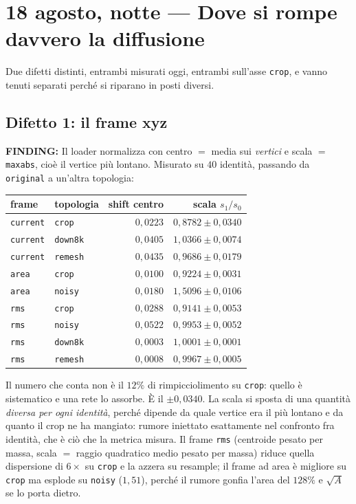 \documentclass[11pt,a4paper]{article}
\newcommand{\finding}[1]{\textcolor{finding}{\textbf{FINDING:}} #1}
\begin{document}
\section{18 agosto, notte --- Dove si rompe davvero la diffusione}

Due difetti distinti, entrambi misurati oggi, entrambi sull'asse \texttt{crop}, e vanno tenuti
separati perch\'e si riparano in posti diversi.

\subsection*{Difetto 1: il frame xyz}

\finding{Il loader normalizza con centro $=$ media sui \emph{vertici} e scala $=$
\texttt{maxabs}, cio\`e il vertice pi\`u lontano. Misurato su $40$ identit\`a, passando da
\texttt{original} a un'altra topologia:}

\begin{center}\small
\begin{tabular}{llrr}
\toprule
frame & topologia & shift centro & scala $s_1/s_0$ \\
\midrule
\texttt{current} & \texttt{crop}   & $0{,}0223$ & $0{,}8782 \pm 0{,}0340$ \\
\texttt{current} & \texttt{down8k} & $0{,}0405$ & $1{,}0366 \pm 0{,}0074$ \\
\texttt{current} & \texttt{remesh} & $0{,}0435$ & $0{,}9686 \pm 0{,}0179$ \\
\midrule
\texttt{area}    & \texttt{crop}   & $0{,}0100$ & $0{,}9224 \pm 0{,}0031$ \\
\texttt{area}    & \texttt{noisy}  & $0{,}0180$ & $1{,}5096 \pm 0{,}0106$ \\
\midrule
\texttt{rms}     & \texttt{crop}   & $0{,}0288$ & $0{,}9141 \pm 0{,}0053$ \\
\texttt{rms}     & \texttt{noisy}  & $0{,}0522$ & $0{,}9953 \pm 0{,}0052$ \\
\texttt{rms}     & \texttt{down8k} & $0{,}0003$ & $1{,}0001 \pm 0{,}0001$ \\
\texttt{rms}     & \texttt{remesh} & $0{,}0008$ & $0{,}9967 \pm 0{,}0005$ \\
\bottomrule
\end{tabular}
\end{center}

Il numero che conta non \`e il $12\%$ di rimpicciolimento su \texttt{crop}: quello \`e
sistematico e una rete lo assorbe. \`E il $\pm 0{,}0340$. La scala si sposta di una quantit\`a
\emph{diversa per ogni identit\`a}, perch\'e dipende da quale vertice era il pi\`u lontano e da
quanto il crop ne ha mangiato: rumore iniettato esattamente nel confronto fra identit\`a, che \`e
ci\`o che la metrica misura. Il frame \texttt{rms} (centroide pesato per massa, scala $=$ raggio
quadratico medio pesato per massa) riduce quella dispersione di $6\times$ su \texttt{crop} e la
azzera su resample; il frame ad area \`e migliore su \texttt{crop} ma esplode su \texttt{noisy}
($1{,}51$), perch\'e il rumore gonfia l'area del $128\%$ e $\sqrt{A}$ se lo porta dietro.
\end{document}

